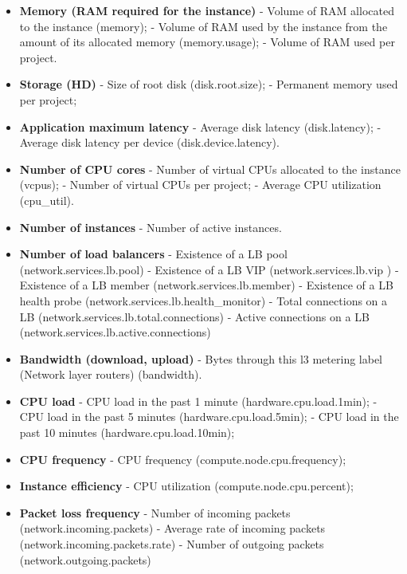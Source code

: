 \documentclass[conference]{IEEEtran}
\begin{document}
\begin{itemize}
 \item \textbf{Memory (RAM required for the instance)}
    \subitem - Volume of RAM allocated to the instance (memory);
    \subitem - Volume of RAM used by the instance from the amount of its allocated memory (memory.usage);
    \subitem - Volume of RAM used per project.
 \item \textbf{Storage (HD)}
    \subitem - Size of root disk (disk.root.size);
    \subitem - Permanent memory used per project;
 \item \textbf{Application maximum latency}
    \subitem - Average disk latency (disk.latency);
    \subitem - Average disk latency per device (disk.device.latency).
 \item \textbf{Number of CPU cores}
    \subitem - Number of virtual CPUs allocated to the instance (vcpus);
    \subitem - Number of virtual CPUs per project;
    \subitem - Average CPU utilization (cpu\_util).
 \item \textbf{Number of instances}
    \subitem - Number of active instances.
 \item \textbf{Number of load balancers}
  \subitem - Existence of a LB pool (network.services.lb.pool)
  \subitem - Existence of a LB VIP (network.services.lb.vip )
  \subitem - Existence of a LB member (network.services.lb.member)
  \subitem - Existence of a LB health probe (network.services.lb.health\_monitor)
  \subitem - Total connections on a LB (network.services.lb.total.connections)
  \subitem - Active connections on a LB (network.services.lb.active.connections)
  \item \textbf{Bandwidth (download, upload)}
    \subitem - Bytes through this l3 metering label (Network layer routers) (bandwidth).
  \item \textbf{CPU load}   
    \subitem - CPU load in the past 1 minute (hardware.cpu.load.1min);
    \subitem - CPU load in the past 5 minutes (hardware.cpu.load.5min);
    \subitem - CPU load in the past 10 minutes (hardware.cpu.load.10min);
  \item \textbf{CPU frequency}  
    \subitem - CPU frequency (compute.node.cpu.frequency);
  \item \textbf{Instance efficiency}    
    \subitem - CPU utilization (compute.node.cpu.percent);
  \item \textbf{Packet loss frequency}   
    \subitem - Number of incoming packets (network.incoming.packets)
    \subitem - Average rate of incoming packets (network.incoming.packets.rate)
    \subitem - Number of outgoing packets (network.outgoing.packets)

\end{itemize}
\end{document}
